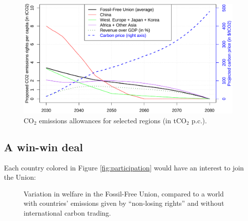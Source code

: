 \documentclass[12pt,english]{article}
\begin{document}
\begin{figure}[h]
  \centering \caption{CO$_\text{2}$ emissions allowances for selected regions (in tCO$_\text{2}$ p.c.).\label{fig:trajectories}}
  \includegraphics[width=.7\textwidth]{../figures/policies/ffu_rights_pc_price_revenue.pdf} 
\end{figure}



\subsection{A win-win deal\label{subsec:winwin}}

Each country colored in Figure \ref{fig:participation} would have an interest to join the Union: 

\begin{figure}[t] 
  \caption{Variation in welfare in the Fossil-Free Union, compared to a world with countries' emissions given by ``non-losing rights'' and without international carbon trading.}\label{fig:var_ede}
\end{figure}
\end{document}
